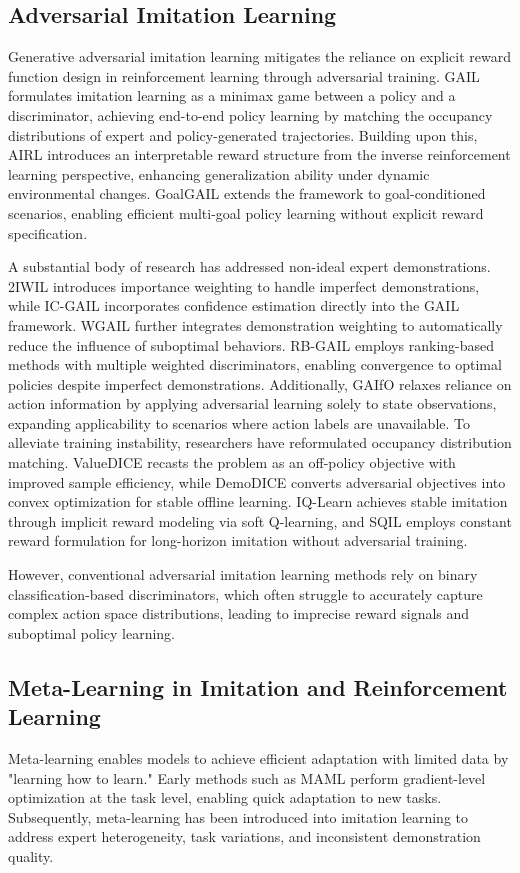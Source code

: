 \documentclass[lettersize,journal]{IEEEtran}
\begin{document}
\subsection{Adversarial Imitation Learning}
Generative adversarial imitation learning mitigates the reliance on explicit reward function design in reinforcement learning through adversarial training. GAIL formulates imitation learning as a minimax game between a policy and a discriminator, achieving end-to-end policy learning by matching the occupancy distributions of expert and policy-generated trajectories. Building upon this, AIRL introduces an interpretable reward structure from the inverse reinforcement learning perspective, enhancing generalization ability under dynamic environmental changes. GoalGAIL extends the framework to goal-conditioned scenarios, enabling efficient multi-goal policy learning without explicit reward specification.

A substantial body of research has addressed non-ideal expert demonstrations. 2IWIL introduces importance weighting to handle imperfect demonstrations, while IC-GAIL incorporates confidence estimation directly into the GAIL framework. WGAIL further integrates demonstration weighting to automatically reduce the influence of suboptimal behaviors. RB-GAIL employs ranking-based methods with multiple weighted discriminators, enabling convergence to optimal policies despite imperfect demonstrations. Additionally, GAIfO relaxes reliance on action information by applying adversarial learning solely to state observations, expanding applicability to scenarios where action labels are unavailable.
To alleviate training instability, researchers have reformulated occupancy distribution matching. ValueDICE recasts the problem as an off-policy objective with improved sample efficiency, while DemoDICE converts adversarial objectives into convex optimization for stable offline learning. IQ-Learn achieves stable imitation through implicit reward modeling via soft Q-learning, and SQIL employs constant reward formulation for long-horizon imitation without adversarial training.

However, conventional adversarial imitation learning methods rely on binary classification-based discriminators, which often struggle to accurately capture complex action space distributions, leading to imprecise reward signals and suboptimal policy learning.
\subsection{Meta-Learning in Imitation and Reinforcement Learning}
Meta-learning enables models to achieve efficient adaptation with limited data by "learning how to learn." Early methods such as MAML perform gradient-level optimization at the task level, enabling quick adaptation to new tasks. Subsequently, meta-learning has been introduced into imitation learning to address expert heterogeneity, task variations, and inconsistent demonstration quality.
\end{document}
